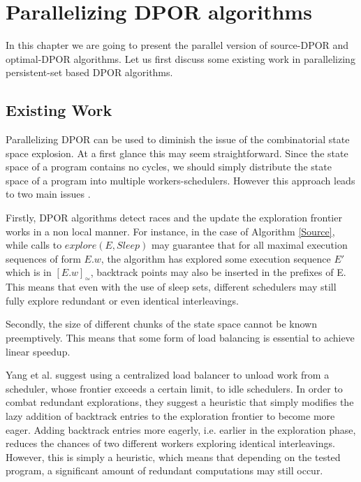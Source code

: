 \chapter{Parallelizing DPOR algorithms}
\label{paradpor}

In this chapter we are going to present the parallel version of source-DPOR and optimal-DPOR algorithms. Let us first
discuss some existing work in parallelizing persistent-set based DPOR algorithms.

\section{Existing Work}

Parallelizing DPOR can be used to diminish the issue of the combinatorial state space explosion. At a first glance this 
 may seem straightforward. Since the state space of a program contains no cycles, we should simply distribute the state 
space of a program into multiple workers-schedulers. However this approach leads to two main issues \cite{Yang:2007:DDP:1770532.1770541}.

Firstly, DPOR algorithms detect races and the update the exploration frontier works in a non local manner. For instance,
in the case of Algorithm \ref{Source}, while calls to $explore(E, Sleep)$ may guarantee that for all maximal execution 
sequences of form $E.w$, the algorithm has explored some execution sequence $E'$ which is in $[E.w]_\simeq$, backtrack points
may also be inserted in the prefixes of E. This means that even with the use of sleep sets, different schedulers may still fully explore
redundant or even identical interleavings.

Secondly, the size of different chunks of the state space cannot be known preemptively. This means that some form of load balancing
is essential to achieve linear speedup.

Yang et al. \cite{Yang:2007:DDP:1770532.1770541} suggest using a centralized load balancer to unload work from a scheduler, whose
frontier exceeds a certain limit, to idle schedulers. In order to combat redundant explorations, they suggest a heuristic
that simply modifies the lazy addition of backtrack entries to the exploration frontier \cite{FlanaganDPOR} to become more eager.
Adding backtrack entries more eagerly, i.e. earlier in the exploration phase, reduces the chances of two different workers
exploring identical interleavings. However, this is simply a heuristic, which means that
depending on the tested program, a significant amount of redundant computations
may still occur.


